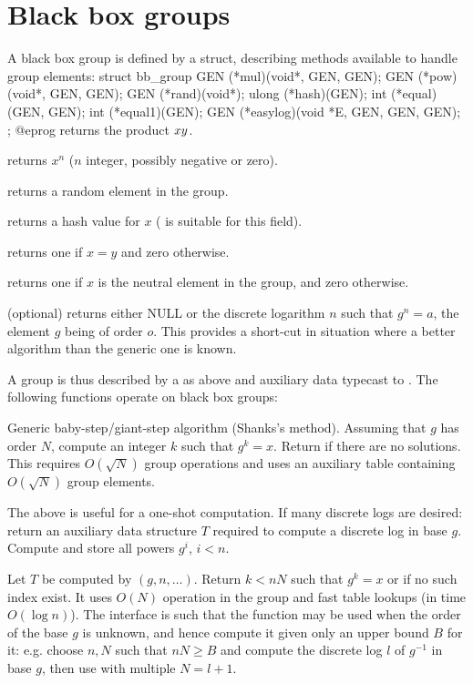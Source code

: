 \section{Black box groups}

A black box group is defined by a  struct, describing methods
available to handle group elements:
\bprog
    struct bb_group
    {
      GEN (*mul)(void*, GEN, GEN);
      GEN (*pow)(void*, GEN, GEN);
      GEN (*rand)(void*);
      ulong (*hash)(GEN);
      int (*equal)(GEN, GEN);
      int (*equal1)(GEN);
      GEN (*easylog)(void *E, GEN, GEN, GEN);
    };
@eprog
 returns the product $x\*y$.

 returns $x^n$ ($n$ integer, possibly negative or zero).

 returns a random element in the group.

 returns a hash value for $x$ ( is suitable for this field).

 returns one if $x=y$ and zero otherwise.

 returns one if $x$ is the neutral element in the group,
and zero otherwise.

 (optional) returns either NULL or the discrete logarithm
$n$ such that $g^n=a$, the element $g$ being of order $o$. This provides a
short-cut in situation where a better algorithm than the generic one is known.

A group is thus described by a  as above and auxiliary
data typecast to . The following functions operate on black box
groups:

 \break
Generic baby-step/giant-step algorithm (Shanks's method). Assuming
that $g$ has order $N$, compute an integer $k$ such that $g^k = x$.
Return  if there are no solutions. This requires
$O(\sqrt{N})$ group operations and uses an auxiliary table containing
$O(\sqrt{N})$ group elements.

The above is useful for a one-shot computation. If many discrete logs
are desired:
return an auxiliary data structure $T$ required to compute a discrete log in
base $g$. Compute and store all powers $g^i$,  $i < n$.

Let $T$ be computed by $(g,n,\dots)$.
Return $k < n N$ such that  $g^k = x$ or  if no such index exist.
It uses $O(N)$ operation in the group and fast table lookups  (in time
$O(\log n)$). The interface is such that the function may be used when the
order of the base $g$ is unknown, and hence compute it given only an upper
bound $B$ for it: e.g. choose $n,N$ such that $nN \geq B$ and compute the
discrete log $l$ of $g^{-1}$ in base $g$, then use 
with multiple $N = l+1$.

